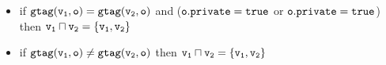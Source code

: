 \begin{itemize}
\begin{itemize}
  \item if $\tt gtag(\frag_1, o) = gtag(\frag_2, o)$ and ($\tt \privateat{\outat{\frag_1}} = true$ or $\tt \privateat{\outat{\frag_1}} = true$) then  $\tt \frag_1 \sqcap \frag_2 = \{\frag_1,\frag_2\}$ 

    \item if $\tt gtag(\frag_1, o) \neq gtag(\frag_2, o)$ then $\tt \frag_1 \sqcap \frag_2 = \{\frag_1,\frag_2\}$
 \end{itemize}
 
 \end{itemize}



%

